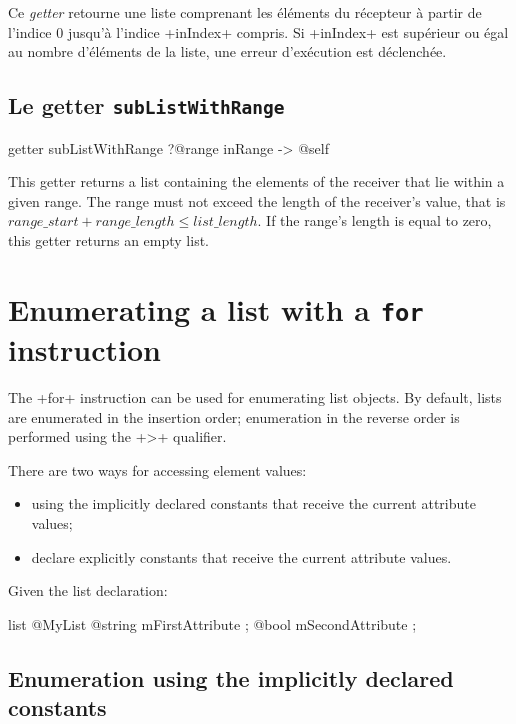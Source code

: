 Ce \emph{getter} retourne une liste comprenant les éléments du récepteur à partir de l'indice $0$ jusqu'à l'indice \ggs+inIndex+ compris. Si \ggs+inIndex+ est supérieur ou égal au nombre d'éléments de la liste, une erreur d'exécution est déclenchée.




\subsection{Le getter \texttt{subListWithRange}}

\begin{galgas}
getter subListWithRange
  ?@range inRange
  -> @self
\end{galgas}

This getter returns a list containing the elements of the receiver that lie within a given range. The range must not exceed the length of the receiver's value, that is $range\_start + range\_length \leqslant list\_length$. If the range's length is equal to zero, this getter returns an empty list.





\section{Enumerating a list with a \texttt{for} instruction}

The \ggs+for+ instruction can be used for enumerating list objects. By default, lists are enumerated in the insertion order; enumeration in the reverse order is performed using the \ggs+>+ qualifier.

There are two ways for accessing element values:
\begin{itemize}
\item using the implicitly declared constants that receive the current attribute values;
\item declare explicitly constants that receive the current attribute values.
\end{itemize}

Given the list declaration:

\begin{galgas}
list @MyList {
  @string mFirstAttribute ;
  @bool mSecondAttribute ;
}
\end{galgas}

\subsection{Enumeration using the implicitly declared constants}

